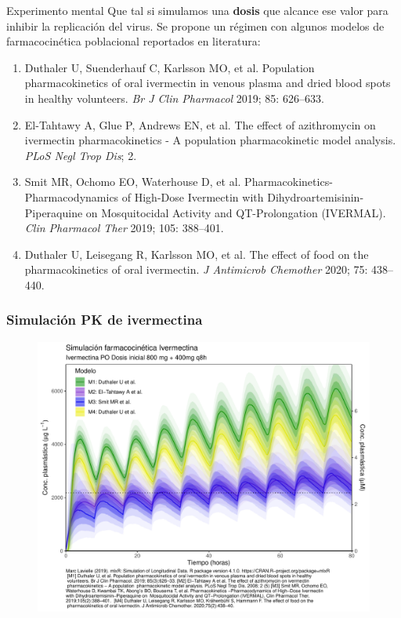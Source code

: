\documentclass[12pt]{beamer}
\begin{document}
	\begin{frame}{Experimento mental}
		\scriptsize
		Que tal si simulamos una \textbf{dosis} que alcance ese valor para inhibir la replicación del virus. Se propone un régimen con algunos modelos de farmacocinética poblacional reportados en literatura: 
		\begin{enumerate}
			\setlength\itemsep{1.5em}
			\item Duthaler U, Suenderhauf C, Karlsson MO, et al. Population pharmacokinetics of oral ivermectin in venous plasma and dried blood spots in healthy volunteers. \textit{Br J Clin Pharmacol} 2019; 85: 626–633. \cite{Duthaler2019}
			\item El-Tahtawy A, Glue P, Andrews EN, et al. The effect of azithromycin on ivermectin pharmacokinetics - A population pharmacokinetic model analysis. \textit{PLoS Negl Trop Dis}; 2. \cite{El-Tahtawy2008}
			\item Smit MR, Ochomo EO, Waterhouse D, et al. Pharmacokinetics-Pharmacodynamics of High-Dose Ivermectin with Dihydroartemisinin-Piperaquine on Mosquitocidal Activity and QT-Prolongation (IVERMAL). \textit{Clin Pharmacol Ther} 2019; 105: 388–401. \cite{Smit2019}
			\item Duthaler U, Leisegang R, Karlsson MO, et al. The effect of food on the pharmacokinetics of oral ivermectin. \textit{J Antimicrob Chemother} 2020; 75: 438–440. \cite{Duthaler2020}
		\end{enumerate}
	\end{frame}

	\begin{frame}
		\frametitle[Experimento mental]{Simulación PK de ivermectina}
		\begin{figure}[t]
			\centering
			\label{fig:pk2opcional8}
			\includegraphics[width=0.8\linewidth]{../modelo_pkpd/PK2_opcional8}
		\end{figure}
	\end{frame}
\end{document}

